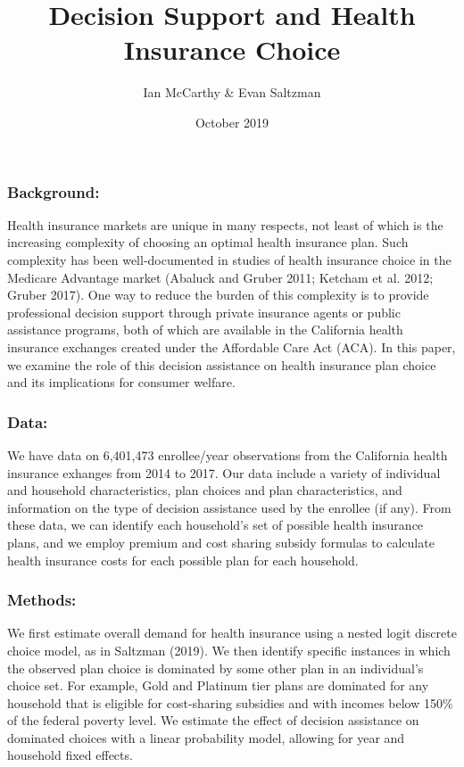 \documentclass[12pt,]{article}
\title{Decision Support and Health Insurance Choice}
\author{Ian McCarthy \& Evan Saltzman}
\date{October 2019}
\begin{document}
\maketitle

\hypertarget{background}{%
\subsubsection{Background:}\label{background}}

Health insurance markets are unique in many respects, not least of which
is the increasing complexity of choosing an optimal health insurance
plan. Such complexity has been well-documented in studies of health
insurance choice in the Medicare Advantage market (Abaluck and Gruber
2011; Ketcham et al. 2012; Gruber 2017). One way to reduce the burden of
this complexity is to provide professional decision support through
private insurance agents or public assistance programs, both of which
are available in the California health insurance exchanges created under
the Affordable Care Act (ACA). In this paper, we examine the role of
this decision assistance on health insurance plan choice and its
implications for consumer welfare.

\hypertarget{data}{%
\subsubsection{Data:}\label{data}}

We have data on 6,401,473 enrollee/year observations from the California
health insurance exhanges from 2014 to 2017. Our data include a variety
of individual and household characteristics, plan choices and plan
characteristics, and information on the type of decision assistance used
by the enrollee (if any). From these data, we can identify each
household's set of possible health insurance plans, and we employ
premium and cost sharing subsidy formulas to calculate health insurance
costs for each possible plan for each household.

\hypertarget{methods}{%
\subsubsection{Methods:}\label{methods}}

We first estimate overall demand for health insurance using a nested
logit discrete choice model, as in Saltzman (2019). We then identify
specific instances in which the observed plan choice is dominated by
some other plan in an individual's choice set. For example, Gold and
Platinum tier plans are dominated for any household that is eligible for
cost-sharing subsidies and with incomes below 150\% of the federal
poverty level. We estimate the effect of decision assistance on
dominated choices with a linear probability model, allowing for year and
household fixed effects.
\end{document}
